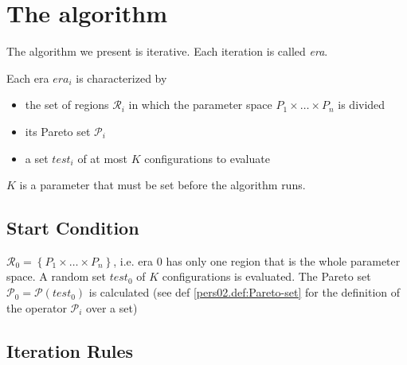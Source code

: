 
\section{The algorithm}
\label{sec:algorithm}

The algorithm we present is iterative. Each iteration is called \emph{era}. 

Each era $era_{i}$ is characterized by 
\begin{itemize}
\item the set of regions $\mathcal{R}_{i}$ in which the parameter space
$P_{1}\times\dots\times P_{n}$ is divided
\item its Pareto set $\mathscr{P}_{i}$
\item a set $test_{i}$ of at most $K$ configurations to evaluate
\end{itemize}
$K$ is a parameter that must be set before the algorithm runs.


\subsection{Start Condition}
$\mathcal{R}_{0}=\left\{ P_{1}\times\dots\times P_{n}\right\} $,
i.e. era $0$ has only one region that is the whole parameter space.
A random set $test_{0}$ of $K$ configurations is evaluated. The
Pareto set $\mathscr{P}_{0}=\mathscr{P}\left(test_{0}\right)$ is
calculated (see def \ref{pers02.def:Pareto-set} for the definition
of the operator $\mathscr{P}_{i}$ over a set)

\subsection{Iteration Rules}

